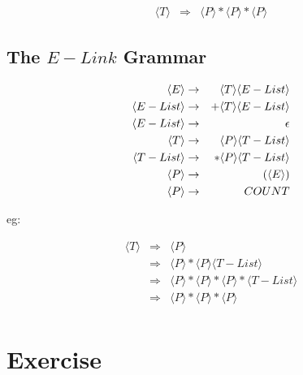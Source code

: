 \documentclass[a4paper,12pt]{article}
\begin{document}
\begin{eqnarray*}
\langle T \rangle	&	\Rightarrow	&	\langle P \rangle \ast \langle P
\rangle \ast \langle P \rangle 
\end{eqnarray*}

\subsection*{The $E-Link$ Grammar}

\begin{eqnarray}
\setcounter{equation}{1}
\langle E \rangle			& 	\to	& \langle T \rangle \langle E-List \rangle \\
\langle E-List \rangle	&	\to	& + \langle T \rangle \langle E-List \rangle \\
\langle E-List \rangle	&	\to	& \epsilon \\
\langle T \rangle 		&	\to	& \langle P \rangle \langle T-List \rangle \\
\langle T-List \rangle	&	\to	& \ast \langle P \rangle \langle T-List \rangle \\
\langle P \rangle			&	\to	& \left( \langle E \rangle \right) \\
\langle P \rangle			&	\to	& COUNT
\end{eqnarray}

eg:

\begin{eqnarray*}
\langle T \rangle	&	\Rightarrow	&	\langle P \rangle \\
						&	\Rightarrow	&	\langle P \rangle \ast \langle P \rangle \langle T-List \rangle \\
						& 	\Rightarrow	& 	\langle P \rangle \ast \langle P \rangle \ast \langle P \rangle \ast \langle T-List \rangle \\
						&	\Rightarrow	&	\langle P \rangle \ast \langle P \rangle \ast \langle P \rangle \\ 
\end{eqnarray*}

\section*{Exercise}
\end{document}
